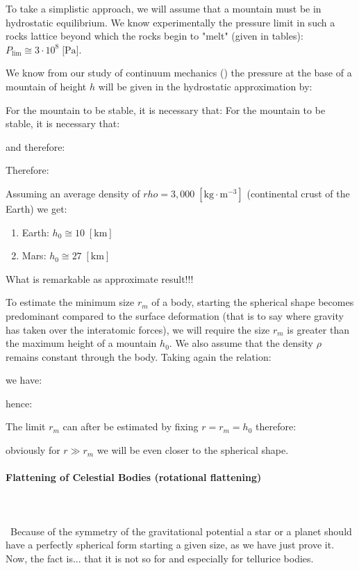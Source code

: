	To take a simplistic approach, we will assume that a mountain must be in hydrostatic equilibrium. We know experimentally the pressure limit in such a rocks lattice beyond which the rocks begin to "melt" (given in tables): $P_{\text{lim}}\cong 3 \cdot 10^8\;\text{[Pa]}$.

	We know from our study of continuum mechanics () the pressure at the base of a mountain of height $h$ will be given in the hydrostatic approximation by:
	
	For the mountain to be stable, it is necessary that:
	For the mountain to be stable, it is necessary that:
	
	and therefore:
	
	Therefore:
	
	Assuming an average density of $rho=3,000\;[\text{kg}\cdot \text{m}^{-3}]$ (continental crust of the Earth) we get:
	\begin{enumerate}
		\item Earth: $h_0\cong 10\; [\text{km}]$
		\item Mars: $h_0\cong 27\; [\text{km}]$
	\end{enumerate}
	What is remarkable as approximate result!!!

	To estimate the minimum size $r_m$ of a body, starting the spherical shape becomes predominant compared to the surface deformation (that is to say where gravity has taken over the interatomic forces), we will require the size $r_m$ is greater than the maximum height of a mountain $h_0$. We also assume that the density $\rho$ remains constant through the body. Taking again the relation:
	
	we have:
	
	hence:
	
	The limit $r_m$ can after be estimated by fixing $r=r_m=h_0$ therefore:
	
	obviously for $r\gg r_m$ we will be even closer to the spherical shape.

	\paragraph{Flattening of Celestial Bodies (rotational flattening)}\mbox{}\\\\\
	Because of the symmetry of the gravitational potential a star or a planet should have a perfectly spherical form starting a given size, as we have just prove it. Now, the fact is... that it is not so for and especially for tellurice bodies.
	
